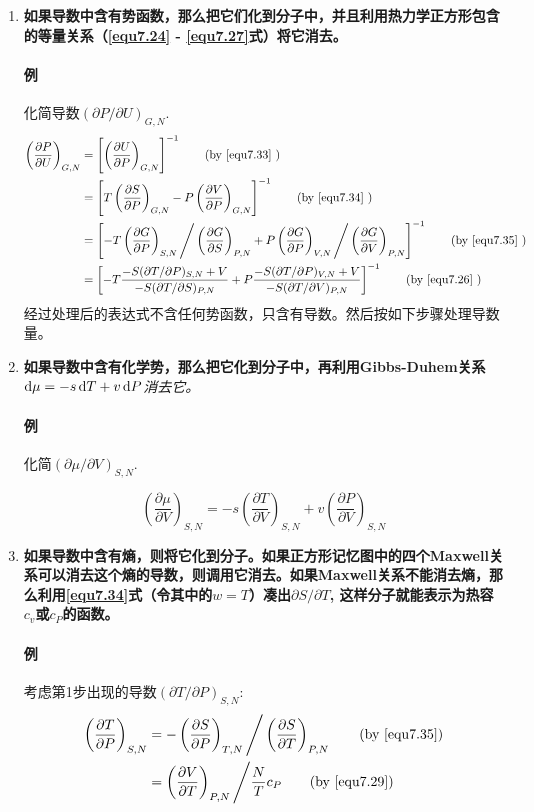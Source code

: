 \begin{enumerate}
\item {\bf 如果导数中含有势函数，那么把它们化到分子中，并且利用热力学正方形包含的等量关系（\eqref{equ7.24} - \eqref{equ7.27}式）将它消去。}
\paragraph{例} 化简导数$(\partial P / \partial U)_{G, N}$.
\begin{align}
	\left( \frac{\partial P}{\partial U} \right)_{G, N} &= \left[ \left( \frac{\partial U}{\partial P} \right)_{G, N} \right]^{-1} \tag{by \eqref{equ7.33} } \\
	&= \left[ T \left( \frac{\partial S}{\partial P} \right)_{G, N} - P \left( \frac{\partial V}{\partial P} \right)_{G, N} \right]^{-1} \tag{by \eqref{equ7.34} }  \\
	&= \left[ -T \left( \frac{\partial G}{\partial P} \right)_{S, N} \Bigg/ \left( \frac{\partial G}{\partial S} \right)_{P, N} + P \left( \frac{\partial G}{\partial P} \right)_{V, N} \Bigg/ \left( \frac{\partial G}{\partial V} \right)_{P, N} \right]^{-1} \tag{by \eqref{equ7.35} } \\
	&= \left[ -T \frac{-S (\partial T / \partial P)_{S, N} + V}{-S (\partial T / \partial S)_{P, N}} + P \frac{-S(\partial T / \partial P)_{V, N} + V}{-S (\partial T / \partial V)_{P, N}} \right]^{-1} \tag{by \eqref{equ7.26} }
\end{align}
经过处理后的表达式不含任何势函数，只含有导数。然后按如下步骤处理导数量。
\item {\bf 如果导数中含有化学势，那么把它化到分子中，再利用Gibbs-Duhem关系}$\mathrm{d} \mu = -s \,\mathrm{d} T + v\,\mathrm{d} P${\it 消去它。}

\paragraph{例} 化简$( \partial \mu / \partial V)_{S, N}$.

\[
	\left( \frac{\partial \mu}{\partial V} \right)_{S, N} = -s \left( \frac{\partial T}{\partial V} \right)_{S, N} + v \left( \frac{\partial P}{\partial V} \right)_{S, N}
\]
\item {\bf 如果导数中含有熵，则将它化到分子。如果正方形记忆图中的四个Maxwell关系可以消去这个熵的导数，则调用它消去。如果Maxwell关系不能消去熵，那么利用\eqref{equ7.34}式（令其中的$w = T$）凑出$\partial S / \partial T$, 这样分子就能表示为热容$c_v$或$c_P$的函数。}

\paragraph{例} 考虑第1步出现的导数$(\partial T / \partial P)_{S, N}$:
\begin{align}
	\left( \frac{\partial T}{\partial P} \right)_{S, N} &= - \left( \frac{\partial S}{\partial P} \right)_{T, N} \Bigg/ \left( \frac{\partial S}{\partial T} \right)_{P, N} \tag{by \eqref{equ7.35}} \\
	&= \left( \frac{\partial V}{\partial T} \right)_{P, N} \Bigg/ \frac{N}{T} c_P \tag{by \eqref{equ7.29}}
\end{align}


\end{enumerate}
